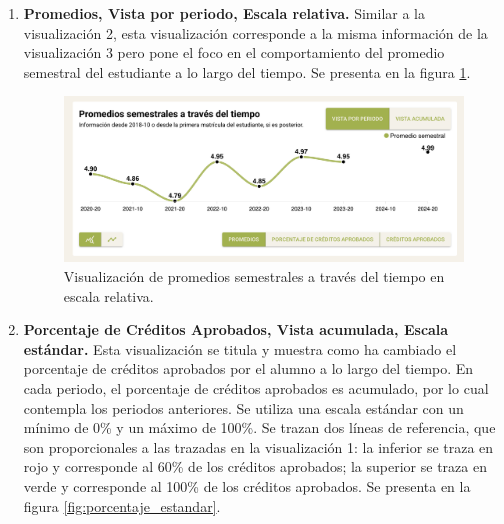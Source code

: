 \begin{enumerate}
	      En la figura \ref{fig:promedios_estandar} resalta que hay un hueco en la gráfica. Esto puede suceder para alumnos que en un periodo académico determinado no tuvieron un promedio semestral numérico. Lo anterior puede deberse a varias causas; algunas de las más comunes son que el estudiante haya cursado un intercambio académico o una práctica académica, o que únicamente haya visto materias con calificación alfabética (por ejemplo: deportes o cursos de inglés). En estos casos, no se calcula un promedio semestral numérico, lo cual se ve reflejado en la gráfica mediante un salto. Ese espacio no se evidencia en la gráfica de la visualización 1 porque el PGA siempre es numérico, y si en un semestre no hay promedio semestral, el PGA se calcula con los promedios semestrales de los semestres anteriores.

	\item \textbf{Promedios, Vista por periodo, Escala relativa.} Similar a la visualización 2, esta visualización corresponde a la misma información de la visualización 3 pero pone el foco en el comportamiento del promedio semestral del estudiante a lo largo del tiempo. Se presenta en la figura \ref{fig:promedios_relativo}.

	      \begin{figure}[H]
		      \noindent
		      \hspace{\leftmargin}
		      \begin{minipage}{\dimexpr\linewidth-\leftmargin\relax}
			      \includegraphics[width=\linewidth]{assets/nes/promedios_relativo.png}
			      \caption{Visualización de promedios semestrales a través del tiempo en escala relativa.}
			      \label{fig:promedios_relativo}
		      \end{minipage}
	      \end{figure}

	\item \textbf{Porcentaje de Créditos Aprobados, Vista acumulada, Escala estándar.} Esta visualización se titula  y muestra como ha cambiado el porcentaje de créditos aprobados por el alumno a lo largo del tiempo. En cada periodo, el porcentaje de créditos aprobados es acumulado, por lo cual contempla los periodos anteriores. Se utiliza una escala estándar con un mínimo de 0\% y un máximo de 100\%. Se trazan dos líneas de referencia, que son proporcionales a las trazadas en la visualización 1: la inferior se traza en rojo y corresponde al 60\% de los créditos aprobados; la superior se traza en verde y corresponde al 100\% de los créditos aprobados. Se presenta en la figura \ref{fig:porcentaje_estandar}.


\end{enumerate}
